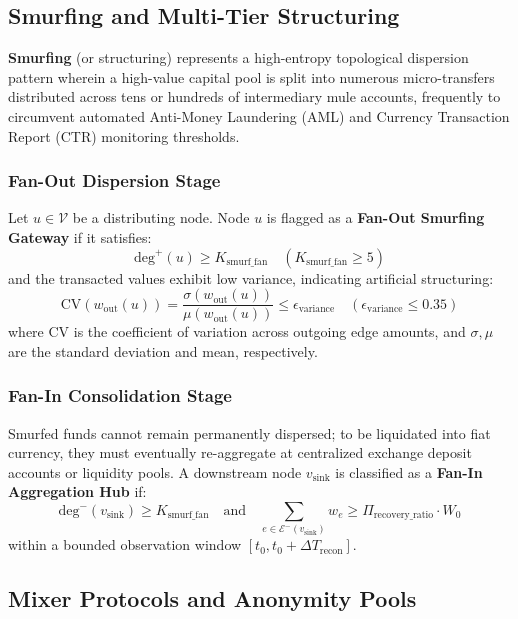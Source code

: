 \subsection{Smurfing and Multi-Tier Structuring}

\textbf{Smurfing} (or structuring) represents a high-entropy topological dispersion pattern wherein a high-value capital pool is split into numerous micro-transfers distributed across tens or hundreds of intermediary mule accounts, frequently to circumvent automated Anti-Money Laundering (AML) and Currency Transaction Report (CTR) monitoring thresholds.

\subsubsection{Fan-Out Dispersion Stage}
Let $u \in \mathcal{V}$ be a distributing node. Node $u$ is flagged as a \textbf{Fan-Out Smurfing Gateway} if it satisfies:
\begin{equation}
    \text{deg}^+(u) \ge K_{\text{smurf\_fan}} \quad (K_{\text{smurf\_fan}} \ge 5)
\end{equation}
and the transacted values exhibit low variance, indicating artificial structuring:
\begin{equation}
    \text{CV}(w_{\text{out}}(u)) = \frac{\sigma(w_{\text{out}}(u))}{\mu(w_{\text{out}}(u))} \le \epsilon_{\text{variance}} \quad (\epsilon_{\text{variance}} \le 0.35)
\end{equation}
where $\text{CV}$ is the coefficient of variation across outgoing edge amounts, and $\sigma, \mu$ are the standard deviation and mean, respectively.

\subsubsection{Fan-In Consolidation Stage}
Smurfed funds cannot remain permanently dispersed; to be liquidated into fiat currency, they must eventually re-aggregate at centralized exchange deposit accounts or liquidity pools. A downstream node $v_{\text{sink}}$ is classified as a \textbf{Fan-In Aggregation Hub} if:
\begin{equation}
    \text{deg}^-(v_{\text{sink}}) \ge K_{\text{smurf\_fan}} \quad \text{and} \quad \sum_{e \in \mathcal{E}^-(v_{\text{sink}})} w_e \ge \Pi_{\text{recovery\_ratio}} \cdot W_0
\end{equation}
within a bounded observation window $[t_0, t_0 + \Delta T_{\text{recon}}]$.

\subsection{Mixer Protocols and Anonymity Pools}

